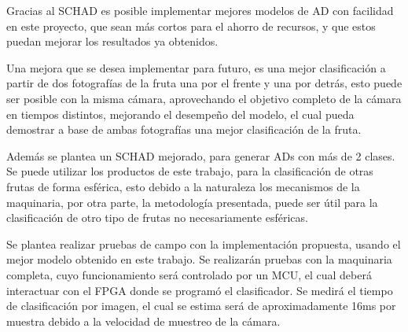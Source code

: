 \documentclass[twoside,spanish,ESP,MSc]{plantillaLabUPV}
\theoremstyle{definition}
\begin{document}
Gracias al SCHAD es posible implementar mejores modelos de AD con facilidad en este proyecto, que sean más cortos para el ahorro de recursos, y que estos puedan mejorar los resultados ya obtenidos.

Una mejora que se desea implementar para futuro, es una mejor clasificación a partir de dos fotografías de la fruta una por el frente y una por detrás, esto puede ser posible con la misma cámara, aprovechando el objetivo completo de la cámara en tiempos distintos, mejorando el desempeño del modelo, el cual pueda demostrar a base de ambas fotografías una mejor clasificación de la fruta.

Además se plantea un SCHAD mejorado, para generar ADs con más de 2 clases. Se puede utilizar los productos de este trabajo, para la clasificación de otras frutas de forma esférica, esto debido a la naturaleza los mecanismos de la maquinaria, por otra parte, la metodología presentada, puede ser útil para la clasificación de otro tipo de frutas no necesariamente esféricas.

Se plantea realizar pruebas de campo con la implementación propuesta, usando el mejor modelo obtenido en este trabajo. Se realizarán pruebas con la maquinaria completa, cuyo funcionamiento será controlado por un MCU, el cual deberá interactuar con el FPGA donde se programó el clasificador. Se medirá el tiempo de clasificación por imagen, el cual se estima será de aproximadamente 16ms por muestra debido a la velocidad de muestreo de la cámara.



\appendix
%


\end{document}
